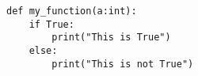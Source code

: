 \documentclass{article}
\begin{document}
\begin{lstlisting}
def my_function(a:int):
    if True:
        print("This is True")
    else:
        print("This is not True")
\end{lstlisting}
\end{document}
